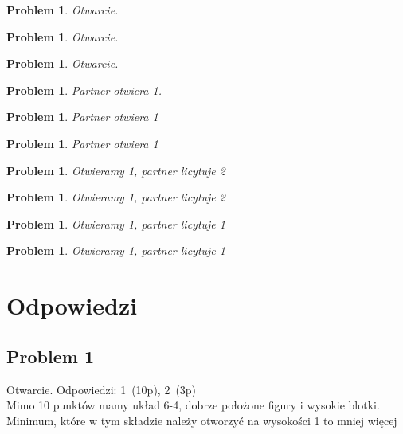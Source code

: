 \documentclass[12pt, a4paper]{article}
\newtheorem{problem}[table]{Problem}
\begin{document}
\begin{problem}
    Otwarcie.
\end{problem}

\begin{problem}
    Otwarcie.
\end{problem}

\begin{problem}
    Otwarcie.
\end{problem}

\begin{problem}
    Partner otwiera \emph{1\hearts}.
\end{problem}

\begin{problem}
    Partner otwiera \emph{1\hearts}
\end{problem}

\begin{problem}
    Partner otwiera \emph{1\nt}
\end{problem}

\begin{problem}
    Otwieramy \emph{1\hearts}, partner licytuje \emph{2\hearts}
\end{problem}

\begin{problem}
    Otwieramy \emph{1\hearts}, partner licytuje \emph{2\nt}
\end{problem}

\begin{problem}
    Otwieramy \emph{1\hearts}, partner licytuje \emph{1\nt}
\end{problem}

\begin{problem}
    Otwieramy \emph{1\diams}, partner licytuje \emph{1\nt}
\end{problem}

\pagebreak

\section*{Odpowiedzi}
\subsection*{Problem 1}
Otwarcie.
Odpowiedzi: 1\spades\ (10p), 2\spades\ (3p) \\
Mimo 10 punktów mamy układ 6-4, dobrze położone figury i wysokie blotki. Minimum, które w tym
składzie należy otworzyć na wysokości 1 to mniej więcej 
\end{document}
